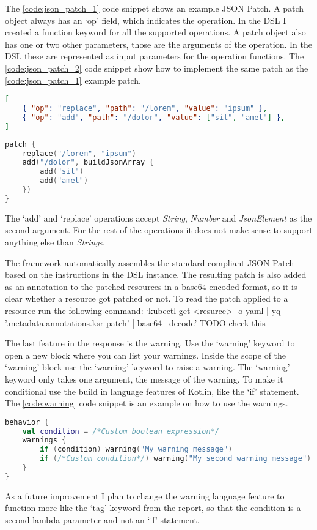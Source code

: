 The \ref{code:json_patch_1} code snippet shows an example JSON Patch. A patch object always has an `op' field, which indicates the operation. In the DSL I created a function keyword for all the supported operations. A patch object also has one or two other parameters, those are the arguments of the operation. In the DSL these are represented as input parameters for the operation functions. The \ref{code:json_patch_2} code snippet show how to implement the same patch as the \ref{code:json_patch_1} example patch.

\begin{lstlisting}[caption={JSON Patch example},language=JSON,label=code:json_patch_1]
[
    { "op": "replace", "path": "/lorem", "value": "ipsum" },
    { "op": "add", "path": "/dolor", "value": ["sit", "amet"] },
]
\end{lstlisting}

\begin{lstlisting}[caption={JSON Patch using DSL},language=Kotlin,label=code:json_patch_2]
patch {
    replace("/lorem", "ipsum")
    add("/dolor", buildJsonArray {
        add("sit")
        add("amet")
    })
}
\end{lstlisting}

The `add' and `replace' operations accept \emph{String}, \emph{Number} and \emph{JsonElement} as the second argument. For the rest of the operations it does not make sense to support anything else than \emph{String}s.

The framework automatically assembles the standard compliant JSON Patch based on the instructions in the DSL instance. The resulting patch is also added as an annotation to the patched resources in a base64 encoded format, so it is clear whether a resource got patched or not. To read the patch applied to a resource run the following command: `kubectl get <resurce> -o yaml | yq '.metadata.annotations.ksr-patch' | base64 --decode' TODO check this

The last feature in the response is the warning. Use the `warning' keyword to open a new block where you can list your warnings. Inside the scope of the `warning' block use the `warning' keyword to raise a warning. The `warning' keyword only takes one argument, the message of the warning. To make it conditional use the build in language features of Kotlin, like the `if' statement. The \ref{code:warning} code snippet is an example on how to use the warnings.

\begin{lstlisting}[caption={JSON Patch using DSL},language=Kotlin,label=code:warning]
behavior {
    val condition = /*Custom boolean expression*/
    warnings {
        if (condition) warning("My warning message")
        if (/*Custom condition*/) warning("My second warning message")
    }
}
\end{lstlisting}

As a future improvement I plan to change the warning language feature to function more like the `tag' keyword from the report, so that the condition is a second lambda parameter and not an `if' statement.
